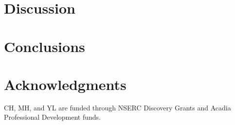 \documentclass[fleqn,10pt]{SelfArx} %
\begin{document}

\section{Discussion}



\section{Conclusions}


\section*{Acknowledgments} %
CH, MH, and YL  are funded through NSERC Discovery Grants and Acadia Professional Development funds. 







\end{document}
